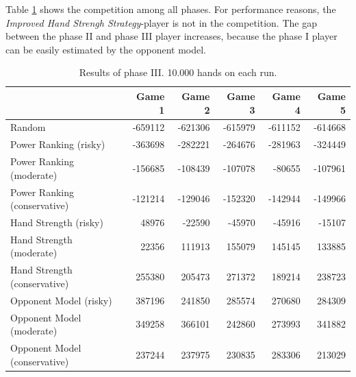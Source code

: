 Table \ref{tbl:resultsPhase3b} shows the competition among all phases. For performance reasons, the \emph{Improved Hand Strengh Strategy}-player is not in the competition. The gap between the phase II and phase III player increases, because the phase I player can be easily estimated by the opponent model.
\begin{table}[h]
	\centering
	\begin{tabular}[h]{l|r|r|r|r|r}
		& \textbf{Game 1} & \textbf{Game 2} & \textbf{Game 3} & \textbf{Game 4} & \textbf{Game 5}\\
		\hline
		Random  & -659112 & -621306 & -615979 & -611152 & -614668\\
		Power Ranking (risky) & -363698 & -282221 & -264676 & -281963 & -324449\\
		Power Ranking (moderate) & -156685 & -108439 & -107078 & -80655 & -107961\\
		Power Ranking (conservative) & -121214 & -129046 & -152320 & -142944 & -149966\\
		Hand Strength (risky) & 48976 & -22590 & -45970 & -45916 & -15107\\
		Hand Strength (moderate) & 22356 & 111913 & 155079 & 145145 & 133885\\
		Hand Strength (conservative) & 255380 & 205473 & 271372 & 189214 & 238723\\
		Opponent Model (risky) & 387196 & 241850 & 285574 & 270680 & 284309\\
		Opponent Model (moderate) & 349258 & 366101 & 242860 & 273993 & 341882\\
		Opponent Model (conservative) & 237244 & 237975 & 230835 & 283306 & 213029\\
	\end{tabular}
	\label{tbl:resultsPhase3b}
	\caption{Results of phase III. 10.000 hands on each run.}
\end{table}

